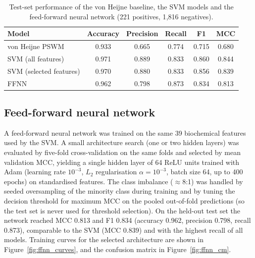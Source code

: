 \begin{table}[ht]
\centering
\begin{tabular}{lccccc}
\toprule
Model & Accuracy & Precision & Recall & F1 & MCC \\
\midrule
von Heijne PSWM         & 0.933 & 0.665 & 0.774 & 0.715 & 0.680 \\
SVM (all features)      & 0.971 & 0.889 & 0.833 & 0.860 & 0.844 \\
SVM (selected features) & 0.970 & 0.880 & 0.833 & 0.856 & 0.839 \\
FFNN                    & 0.962 & 0.798 & 0.873 & 0.834 & 0.813 \\
\bottomrule
\end{tabular}
\caption{Test-set performance of the von Heijne baseline, the SVM models
and the feed-forward neural network (221 positives, 1{,}816 negatives).}
\label{tab:results}
\end{table}


\subsection{Feed-forward neural network}

A feed-forward neural network was trained on the same 39 biochemical
features used by the SVM. A small architecture search (one or two hidden
layers) was evaluated by five-fold cross-validation on the same folds and
selected by mean validation MCC, yielding a single hidden layer of 64
ReLU units trained with Adam (learning rate $10^{-3}$, $L_2$
regularisation $\alpha=10^{-3}$, batch size 64, up to 400 epochs) on
standardised features. The class imbalance ($\approx$8:1) was handled by
seeded oversampling of the minority class during training and by tuning
the decision threshold for maximum MCC on the pooled out-of-fold
predictions (so the test set is never used for threshold selection). On
the held-out test set the network reached MCC 0.813 and F1 0.834
(accuracy 0.962, precision 0.798, recall 0.873), comparable to the SVM
(MCC 0.839) and with the highest recall of all models. Training curves
for the selected architecture are shown in
Figure~\ref{fig:ffnn_curves}, and the confusion matrix in
Figure~\ref{fig:ffnn_cm}.

